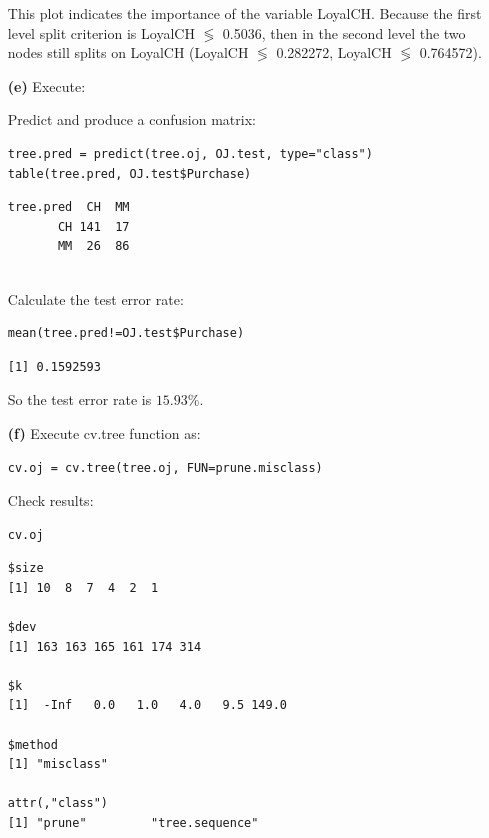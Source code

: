 \documentclass[twoside,11pt]{homework}
\begin{document}
\begin{enumerate}
This plot indicates the importance of the variable LoyalCH. Because the first level split criterion is LoyalCH $\lessgtr$ 0.5036, then in the second level the two nodes still splits on LoyalCH (LoyalCH $\lessgtr$ 0.282272, LoyalCH $\lessgtr$ 0.764572).

\item[\textbf{(e)}] Execute:

Predict and produce a confusion matrix:

\begin{lstlisting}
tree.pred = predict(tree.oj, OJ.test, type="class")
table(tree.pred, OJ.test$Purchase)
\end{lstlisting}

\begin{verbatim}
tree.pred  CH  MM
       CH 141  17
       MM  26  86
       
\end{verbatim}

Calculate the test error rate:

\begin{lstlisting}
mean(tree.pred!=OJ.test$Purchase)
\end{lstlisting}

\begin{verbatim}
[1] 0.1592593

\end{verbatim}

So the test error rate is $15.93\%$.

\item[\textbf{(f)}] Execute cv.tree function as:

\begin{lstlisting}
cv.oj = cv.tree(tree.oj, FUN=prune.misclass)
\end{lstlisting}

Check results:

\begin{lstlisting}
cv.oj
\end{lstlisting}

\begin{verbatim}
$size
[1] 10  8  7  4  2  1

$dev
[1] 163 163 165 161 174 314

$k
[1]  -Inf   0.0   1.0   4.0   9.5 149.0

$method
[1] "misclass"

attr(,"class")
[1] "prune"         "tree.sequence"

\end{verbatim}


\end{enumerate}
\end{document}
